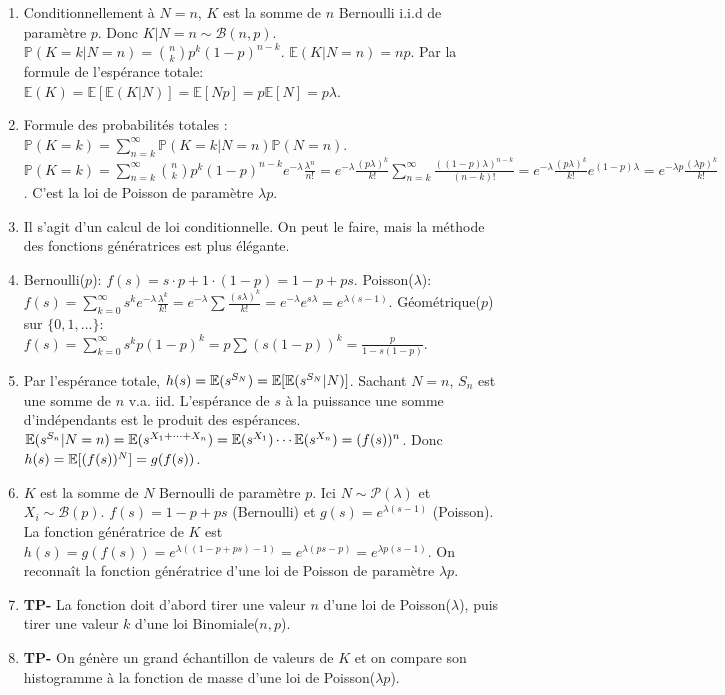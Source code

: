 \documentclass[solutions]{exercices}
\begin{document}
\begin{solution}
	\begin{enumerate}
		\item Conditionnellement à $N=n$, $K$ est la somme de $n$ Bernoulli i.i.d de paramètre $p$. Donc $K|N=n \sim \mathcal{B}(n,p)$.
		      $\mathbb{P}(K=k|N=n) = \binom{n}{k}p^k(1-p)^{n-k}$.
		      $\mathbb{E}(K|N=n) = np$.
		      Par la formule de l'espérance totale: $\mathbb{E}(K) = \mathbb{E}[\mathbb{E}(K|N)] = \mathbb{E}[Np] = p\mathbb{E}[N] = p\lambda$.
		\item Formule des probabilités totales : $\mathbb{P}(K=k) = \sum_{n=k}^\infty \mathbb{P}(K=k|N=n)\mathbb{P}(N=n)$.
		      $\mathbb{P}(K=k) = \sum_{n=k}^\infty \binom{n}{k}p^k(1-p)^{n-k} e^{-\lambda}\frac{\lambda^n}{n!} = e^{-\lambda}\frac{(p\lambda)^k}{k!} \sum_{n=k}^\infty \frac{((1-p)\lambda)^{n-k}}{(n-k)!} = e^{-\lambda}\frac{(p\lambda)^k}{k!} e^{(1-p)\lambda} = e^{-\lambda p}\frac{(\lambda p)^k}{k!}$.
		      C'est la loi de Poisson de paramètre $\lambda p$.
		\item Il s'agit d'un calcul de loi conditionnelle. On peut le faire, mais la méthode des fonctions génératrices est plus élégante.
		\item Bernoulli($p$): $f(s) = s \cdot p + 1 \cdot (1-p) = 1-p+ps$.
		      Poisson($\lambda$): $f(s) = \sum_{k=0}^\infty s^k e^{-\lambda}\frac{\lambda^k}{k!} = e^{-\lambda}\sum \frac{(s\lambda)^k}{k!} = e^{-\lambda}e^{s\lambda} = e^{\lambda(s-1)}$.
		      Géométrique($p$) sur $\{0,1,\dots\}$: $f(s) = \sum_{k=0}^\infty s^k p(1-p)^k = p \sum (s(1-p))^k = \frac{p}{1-s(1-p)}$.
		\item Par l'espérance totale, $h(s) = \mathbb{E}(s^{S_N}) = \mathbb{E}[\mathbb{E}(s^{S_N}|N)]$. Sachant $N=n$, $S_n$ est une somme de $n$ v.a. iid. L'espérance de $s$ à la puissance une somme d'indépendants est le produit des espérances.
		      $\mathbb{E}(s^{S_n}|N=n) = \mathbb{E}(s^{X_1+\dots+X_n}) = \mathbb{E}(s^{X_1})\cdots\mathbb{E}(s^{X_n}) = (f(s))^n$.
		      Donc $h(s) = \mathbb{E}[(f(s))^N] = g(f(s))$.
		\item $K$ est la somme de $N$ Bernoulli de paramètre $p$. Ici $N \sim \mathcal{P}(\lambda)$ et $X_i \sim \mathcal{B}(p)$.
		      $f(s) = 1-p+ps$ (Bernoulli) et $g(s) = e^{\lambda(s-1)}$ (Poisson).
		      La fonction génératrice de $K$ est $h(s) = g(f(s)) = e^{\lambda((1-p+ps)-1)} = e^{\lambda(ps-p)} = e^{\lambda p(s-1)}$.
		      On reconnaît la fonction génératrice d'une loi de Poisson de paramètre $\lambda p$.
		\item \textbf{TP-} La fonction doit d'abord tirer une valeur $n$ d'une loi de Poisson($\lambda$), puis tirer une valeur $k$ d'une loi Binomiale($n,p$).
		\item \textbf{TP-} On génère un grand échantillon de valeurs de $K$ et on compare son histogramme à la fonction de masse d'une loi de Poisson($\lambda p$).
	\end{enumerate}
\end{solution}
\end{document}
